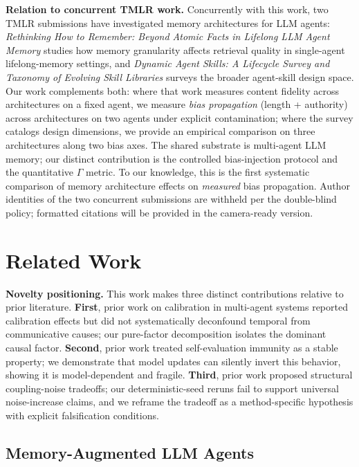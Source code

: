 \documentclass[11pt]{article}
\begin{document}
\noindent\textbf{Relation to concurrent TMLR work.}
Concurrently with this work, two TMLR submissions have investigated memory architectures for LLM agents: \textit{Rethinking How to Remember: Beyond Atomic Facts in Lifelong LLM Agent Memory} studies how memory granularity affects retrieval quality in single-agent lifelong-memory settings, and \textit{Dynamic Agent Skills: A Lifecycle Survey and Taxonomy of Evolving Skill Libraries} surveys the broader agent-skill design space. Our work complements both: where that work measures content fidelity across architectures on a fixed agent, we measure \emph{bias propagation} (length + authority) across architectures on two agents under explicit contamination; where the survey catalogs design dimensions, we provide an empirical comparison on three architectures along two bias axes. The shared substrate is multi-agent LLM memory; our distinct contribution is the controlled bias-injection protocol and the quantitative $\Gamma$ metric. To our knowledge, this is the first systematic comparison of memory architecture effects on \emph{measured} bias propagation. Author identities of the two concurrent submissions are withheld per the double-blind policy; formatted citations will be provided in the camera-ready version.


\section{Related Work}
\textbf{Novelty positioning.} This work makes three distinct contributions relative to prior literature. \textbf{First}, prior work on calibration in multi-agent systems reported calibration effects but did not systematically deconfound temporal from communicative causes; our pure-factor decomposition isolates the dominant causal factor. \textbf{Second}, prior work treated self-evaluation immunity as a stable property; we demonstrate that model updates can silently invert this behavior, showing it is model-dependent and fragile. \textbf{Third}, prior work proposed structural coupling-noise tradeoffs; our deterministic-seed reruns fail to support universal noise-increase claims, and we reframe the tradeoff as a method-specific hypothesis with explicit falsification conditions.



\subsection{Memory-Augmented LLM Agents}
\end{document}

